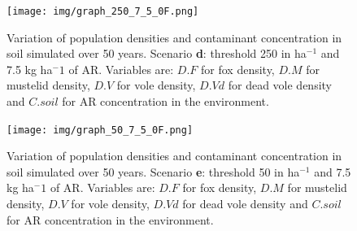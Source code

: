 \documentclass[11pt]{article}
\begin{document}
\begin{figure}[!htb]
	\begin{center}
		\texttt{[image: img/graph\_250\_7\_5\_0F.png]}
		\caption{Variation of population densities and contaminant concentration in soil simulated over 50 years. Scenario \textbf{d}: threshold 250 in ha$^{-1}$ and 7.5 kg ha$^-1$ of AR. Variables are: $D.F$ for fox density, $D.M$ for mustelid density, $D.V$ for vole density, $D.Vd$ for dead vole density and $C.soil$ for AR concentration in the environment.}
	\end{center}
\end{figure}

\begin{figure}[!htb]
	\begin{center}
		\texttt{[image: img/graph\_50\_7\_5\_0F.png]}
		\caption{Variation of population densities and contaminant concentration in soil simulated over 50 years. Scenario \textbf{e}: threshold 50 in ha$^{-1}$ and 7.5 kg ha$^-1$ of AR. Variables are: $D.F$ for fox density, $D.M$ for mustelid density, $D.V$ for vole density, $D.Vd$ for dead vole density and $C.soil$ for AR concentration in the environment.}
	\end{center}
\end{figure}



 \clearpage


%
%

\end{document}
